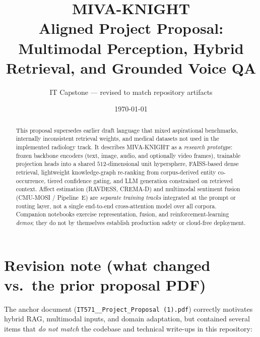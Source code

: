 \documentclass[12pt,a4paper]{article}
\title{\textbf{MIVA-KNIGHT}\\[0.25em]
\large Aligned Project Proposal:\\
Multimodal Perception, Hybrid Retrieval, and Grounded Voice QA}
\author{IT Capstone --- revised to match repository artifacts}
\date{\today}
\begin{document}
\maketitle

\begin{abstract}
This proposal supersedes earlier draft language that mixed aspirational benchmarks,
internally inconsistent retrieval weights, and medical datasets not used in the
implemented radiology track. It describes MIVA-KNIGHT as a \emph{research prototype}:
frozen backbone encoders (text, image, audio, and optionally video frames), trainable
projection heads into a shared $512$-dimensional unit hypersphere, FAISS-based dense
retrieval, lightweight knowledge-graph re-ranking from corpus-derived entity
co-occurrence, tiered confidence gating, and LLM generation constrained on retrieved
context. Affect estimation (RAVDESS, CREMA-D) and multimodal sentiment fusion
(CMU-MOSI / Pipeline~E) are \emph{separate training tracks} integrated at the prompt or
routing layer, not a single end-to-end cross-attention model over all corpora.
Companion notebooks exercise representation, fusion, and reinforcement-learning
\emph{demos}; they do not by themselves establish production safety or cloud-free
deployment.
\end{abstract}

\section{Revision note (what changed vs.\ the prior proposal PDF)}

The anchor document (\texttt{IT571\_\_Project\_Proposal (1).pdf}) correctly motivates
hybrid RAG, multimodal inputs, and domain adaptation, but contained several items that
\emph{do not match} the codebase and technical write-ups in this repository:
\end{document}
